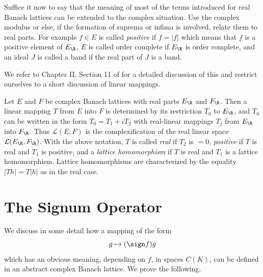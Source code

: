 Suffice it now to say that the meaning of most of the terms introduced for real Banach lattices can be extended to the complex situation.
Use the complex modulus or else, if the formation of suprema or infima is involved, relate them to real parts.
For example $ f \in E $ is called \emph{positive} if\/ $ f = |f| $ which means that $ f $ is a positive element of\/ $ E_{\R} $, $ E $ is called order complete if\/ $ E_{\R} $ is order complete, and an ideal $ J $ is called a band if the real part of\/ $ J $ is a band.

We refer to Chapter II, Section 11 of \textcite{schaefer:1974} for a detailed discussion of this and restrict ourselves to a short discussion of linear mappings.

Let $ E $ and $ F $ be complex Banach lattices with real parts $ E_{\R} $ and $ F_{\R} $.
Then a linear mapping $ T $ from $ E $ into $ F $ is determined by its restriction $ T_{0} $ to $ E_{\R} $, and $ T_{0} $ can be written in the form $ T_{0} = T_{1} + iT_{2} $ with real-linear mappings $ T_{j} $ from $ E_{\R} $ into $ F_{\R} $.
Thus $ \mathcal{L}(E,F) $ is the complexification of the real linear space $ \mathcal{L}(E_{\R},F_{\R}) $.
With the above notation, $ T $ is called \emph{real} if\/ $ T_{2} $ is $ = 0 $, \emph{positive} if\/ $ T $ is real and $ T_{1} $ is positive, and a \emph{lattice homomorphism} if\/ $ T $ is real and $ T_{1} $ is a lattice homomorphism.
Lattice homomorphisms are characterized by the equality $ |Th| = T|h| $ as in the real case.
\section{The Signum Operator}\label{sec:c1-8}%
We discuss in some detail how a mapping of the form
\[
g \mapsto (\sign f )g
\]
which has an obvious meaning, depending on $ f $, in spaces $ C(K) $, can be defined in an abstract complex Banach lattice.
We prove the following.

